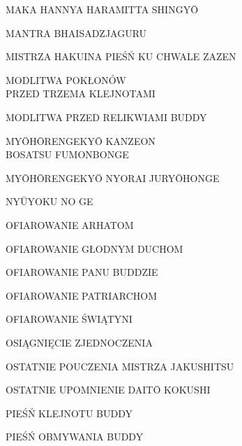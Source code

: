 \par\noindent MAKA HANNYA HARAMITTA SHINGY\=O \dotfill \makebox[1.0cm][r]{\pageref{hannya_shin_gyo}}
\par\noindent MANTRA BHAISADZJAGURU \dotfill \makebox[1.0cm][r]{\pageref{mantra_bhaisadzjaguru}}
\par\noindent MISTRZA HAKUINA PIEŚŃ KU CHWALE ZAZEN \dotfill \makebox[1.0cm][r]{\pageref{mistrza_hakuina_piesn}}
\par\noindent MODLITWA POKŁONÓW\\ PRZED TRZEMA KLEJNOTAMI \dotfill \makebox[1.0cm][r]{\pageref{trzy_skarby}}
\par\noindent MODLITWA PRZED RELIKWIAMI BUDDY \dotfill \makebox[1.0cm][r]{\pageref{przed_relikwiami}}
\par\noindent MY\=OH\=ORENGEKY\=O KANZEON\\ BOSATSU FUMONBONGE \dotfill \makebox[1.0cm][r]{\pageref{myohorengekyo_kanzeonbosatsu_fumonbonge}}
\par\noindent MY\=OH\=ORENGEKY\=O NYORAI JURY\=OHONGE \dotfill \makebox[1.0cm][r]{\pageref{myohorengekyo_nyorai_juryohonge}}
\par\noindent NY\=UYOKU NO GE \dotfill \makebox[1.0cm][r]{\pageref{nyuyoku_no_ge}}
\par\noindent OFIAROWANIE ARHATOM \dotfill \makebox[1.0cm][r]{\pageref{ofiarowanie_arhatom}}
\par\noindent OFIAROWANIE GŁODNYM DUCHOM \dotfill \makebox[1.0cm][r]{\pageref{ofiarowanie_glodnym_duchom}}
\par\noindent OFIAROWANIE PANU BUDDZIE \dotfill \makebox[1.0cm][r]{\pageref{ofiarowanie_panu_buddzie}}
\par\noindent OFIAROWANIE PATRIARCHOM \dotfill \makebox[1.0cm][r]{\pageref{ofiarowanie_patriarchom}}
\par\noindent OFIAROWANIE ŚWIĄTYNI \dotfill \makebox[1.0cm][r]{\pageref{ofiarowanie_swiatyni}}
\par\noindent OSIĄGNIĘCIE ZJEDNOCZENIA \dotfill \makebox[1.0cm][r]{\pageref{osiagniecie_zjednoczenia}}
\par\noindent OSTATNIE POUCZENIA MISTRZA JAKUSHITSU \dotfill \makebox[1.0cm][r]{\pageref{ostatnie_pouczenia_mistrza_jakushitsu}}
\par\noindent OSTATNIE UPOMNIENIE DAIT\=O KOKUSHI \dotfill \makebox[1.0cm][r]{\pageref{ostatnie_upomnienie}}
\par\noindent PIEŚŃ KLEJNOTU BUDDY \dotfill \makebox[1.0cm][r]{\pageref{piesn_klejnotu_buddy}}
\par\noindent PIEŚŃ OBMYWANIA BUDDY \dotfill \makebox[1.0cm][r]{\pageref{piesn_obmywania_buddy}}
